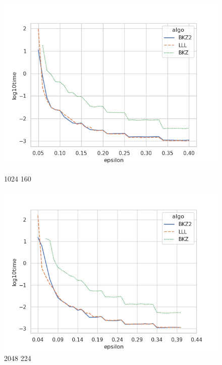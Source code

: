 \documentclass{backend}
\begin{document}
\begin{figure}[H]
    \centering
    \begin{minipage}{0.45\textwidth}
        \centering
        \includegraphics[width=\textwidth]{img/non_contigu/1024_160_mint_maxm_epsi_time_log.png}
        \caption{1024 160}
        \label{fig:1024 160_non_contigu}
    \end{minipage}
    \hfill
    \begin{minipage}{0.45\textwidth}
        \centering
        \includegraphics[width=\textwidth]{img/non_contigu/2048_224_mint_maxm_epsi_time_log.png}
        \caption{2048 224}
        \label{fig:image2_non_contigu}
    \end{minipage}
    \vfill
    \begin{minipage}{0.45\textwidth}

\end{minipage}
\end{figure}
\end{document}

